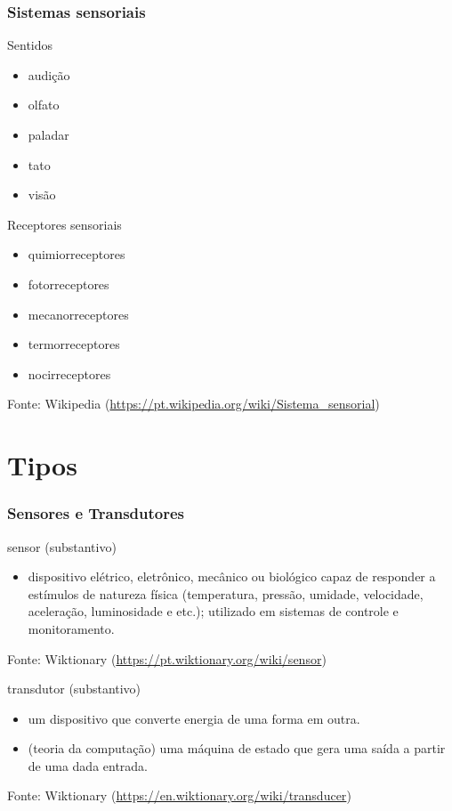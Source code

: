 \documentclass[t]{beamer}
\begin{document}
\begin{frame}
	\frametitle{Sistemas sensoriais}
	Sentidos
	\begin{itemize}
		\item audição
		\item olfato
		\item paladar
		\item tato
		\item visão
	\end{itemize}
	Receptores sensoriais
	\begin{itemize}
		\item quimiorreceptores
		\item fotorreceptores
		\item mecanorreceptores
		\item termorreceptores
		\item nocirreceptores
	\end{itemize}
	{\scriptsize Fonte: Wikipedia (\url{https://pt.wikipedia.org/wiki/Sistema_sensorial})}
\end{frame}

\section{Tipos}

\begin{frame}
	\frametitle{Sensores e Transdutores}
	sensor (substantivo)
	\begin{itemize}
		\item dispositivo elétrico, eletrônico, mecânico ou biológico capaz de responder a estímulos de natureza física (temperatura, pressão, umidade, velocidade, aceleração, luminosidade e etc.); utilizado em sistemas de controle e monitoramento.
	\end{itemize}
	{\scriptsize Fonte: Wiktionary (\url{https://pt.wiktionary.org/wiki/sensor})}
	\bigskip
	
	transdutor (substantivo)
	\begin{itemize}
		\item um dispositivo que converte energia de uma forma em outra.
		\item (teoria da computação) uma máquina de estado que gera uma saída a partir de uma dada entrada.
	\end{itemize}
	{\scriptsize Fonte: Wiktionary (\url{https://en.wiktionary.org/wiki/transducer})}
\end{frame}
\end{document}
